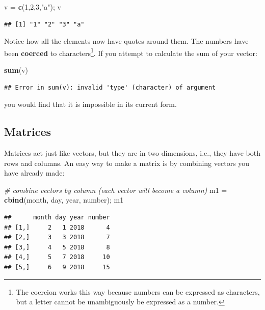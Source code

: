 \documentclass[]{book}
\newenvironment{Shaded}{\begin{snugshade}}{\end{snugshade}}
\newcommand{\KeywordTok}[1]{\textcolor[rgb]{0.13,0.29,0.53}{\textbf{#1}}}
\newcommand{\DecValTok}[1]{\textcolor[rgb]{0.00,0.00,0.81}{#1}}
\newcommand{\StringTok}[1]{\textcolor[rgb]{0.31,0.60,0.02}{#1}}
\newcommand{\CommentTok}[1]{\textcolor[rgb]{0.56,0.35,0.01}{\textit{#1}}}
\newcommand{\NormalTok}[1]{#1}
\let\rmarkdownfootnote\footnote%
\def\footnote{\protect\rmarkdownfootnote}
\theoremstyle{definition}
\theoremstyle{definition}
\theoremstyle{definition}
\theoremstyle{remark}
\begin{document}
\begin{Shaded}
\begin{Highlighting}[]
\NormalTok{v =}\StringTok{ }\KeywordTok{c}\NormalTok{(}\DecValTok{1}\NormalTok{,}\DecValTok{2}\NormalTok{,}\DecValTok{3}\NormalTok{,}\StringTok{"a"}\NormalTok{); v}
\end{Highlighting}
\end{Shaded}

\begin{verbatim}
## [1] "1" "2" "3" "a"
\end{verbatim}

Notice how all the elements now have quotes around them. The numbers
have been \textbf{coerced} to characters\footnote{The coercion works
  this way because numbers can be expressed as characters, but a letter
  cannot be unambiguously be expressed as a number.}. If you attempt to
calculate the sum of your vector:

\begin{Shaded}
\begin{Highlighting}[]
\KeywordTok{sum}\NormalTok{(v)}
\end{Highlighting}
\end{Shaded}

\begin{verbatim}
## Error in sum(v): invalid 'type' (character) of argument
\end{verbatim}

you would find that it is impossible in its current form.

\subsection{Matrices}\label{matrices}

Matrices act just like vectors, but they are in two dimensions, i.e.,
they have both rows and columns. An easy way to make a matrix is by
combining vectors you have already made:

\begin{Shaded}
\begin{Highlighting}[]
\CommentTok{# combine vectors by column (each vector will become a column)}
\NormalTok{m1 =}\StringTok{ }\KeywordTok{cbind}\NormalTok{(month, day, year, number); m1}
\end{Highlighting}
\end{Shaded}

\begin{verbatim}
##      month day year number
## [1,]     2   1 2018      4
## [2,]     3   3 2018      7
## [3,]     4   5 2018      8
## [4,]     5   7 2018     10
## [5,]     6   9 2018     15
\end{verbatim}
\end{document}
